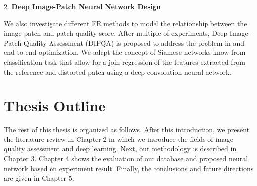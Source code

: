2. \textbf{Deep Image-Patch Neural Network Design}

We also investigate different FR methods to model the relationship between the image patch and patch quality score. 
After multiple of experiments, Deep Image-Patch Quality Assessment (DIPQA) is proposed to address the problem in and end-to-end optimization. 
We adapt the concept of Siamese networks know from classification task \cite{BROMLEY2004,Chopra2005} that allow for a join regression of the features extracted from the reference and distorted patch using a deep convolution neural network. 

\section{Thesis Outline}

The rest of this thesis is organized as follows. After this introduction, we present the literature review in Chapter 2 in which we introduce the fields of image quality assessment and deep learning. Next, our methodology is described in Chapter 3. Chapter 4 shows the evaluation of our database and proposed neural network based on experiment result. Finally, the conclusions and future directions are given in Chapter 5.